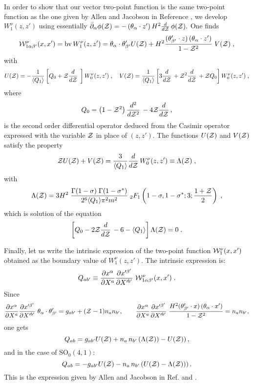\documentclass[a4paper,11pt,showpacs,preprintnumbers]{revtex4}
\def\z {{\cal Z}}
\def\dz {\frac{d}{d{\cal Z}}\,}
\def\ddz {\frac{d^2}{d{\cal Z}^2}\,}
\def\ab{\frac{\partial x^{\alpha}}{\partial X^a}\frac{\partial x'^{\beta'}}{\partial X'^{b'}}\;}
\begin{document}
\begin{appendix}
In order to show that our vector two-point function  is the same
two-point function as the one given by Allen and Jacobson in
Reference \cite{allen}, we develop $W^{\nu}_{1}(z,z')$ using
essentially
$\bar\partial_{\alpha}\phi(\z)=-\left(\theta_{\alpha}\cdot
z'\right)H^{2}\dz \phi(\z).$ One finds
$$ {\cal W}^{\nu}_{1\alpha\beta'}(x,x')=\mbox{bv}\,W^{\nu}_{1}(z,z')=\theta_{\alpha}\cdot\theta'_{\beta'}U(\z)
+H^2{{(\theta'_{\beta'}\cdot z)\left(\theta_{\alpha}\cdot
z'\right)}\over{1-\z^2}}\;V(\z)\;,$$ with
\begin{equation}
U(\z)=-{{1}\over{\langle Q_1\rangle}} \left[Q_{0}+\z\dz\;\right]{
W^{\nu}_{0}(z,z')} \;,\quad V(\z)={{1}\over{\langle
Q_1\rangle}}\left[3\dz+\z^2\dz+\z Q_{0}\right]
W^{\nu}_{0}(z,z')\;,\nonumber
\end{equation}
where
$$Q_{0}=\left(1-\z^2\right)\ddz-4\z\dz,$$
is the second order differential operator deduced from the Casimir
operator expressed with the variable $\z$ in place of $(z,z')$.
The functions $U(\z)$ and $V(\z)$ satisfy the property
$$\z U(\z)+V(\z)={{3}\over{\langle Q_1\rangle}}\dz {W^{\nu}_{0}(z,z')}\equiv\Lambda(\z)\;,$$
with
$$\Lambda(\z)=3H^2\;\frac{ \Gamma(1-\sigma)\; \Gamma (1-\sigma^{*})}{2^6\langle Q_1\rangle \pi^2m^2}\;
_{2}F_{1}\left(1-\sigma,1-\sigma^{*};3;\frac{1+\z}{2}\right) \;,$$
which is solution of the equation
$$\left[Q_{0}-2\z\dz-6-\langle Q_{1}\rangle\right]\Lambda(\z)=0\;.$$

Finally, let us write the intrinsic expression of the two-point
function ${\cal W}^{\nu}_{1}(x,x')$  obtained as the boundary
value of $W^{\nu}_{1}(z,z')$. The intrinsic expression is:
$$Q_{ab'}\equiv\ab {\cal
W}^{\nu}_{1\alpha\beta'}(x,x')\;.$$ Since
$$
\ab\theta_{\alpha}\cdot\theta'_{\beta'}=g_{ab'}+
(\z-1)n_{a}n_{b'},\qquad \ab {{H^2(\theta'_{\beta'}\cdot
x)\left(\theta_{\alpha}\cdot x'\right)}\over{1-\z^2}}=n_{a}n_{b'},
$$
one gets
$$
Q_{ab}=g_{ab'}U(\z)+n_{a}\,n_{b'}\left(\Lambda(\z))-U(\z)\right),
$$
and in the case of SO$_{0}(4,1)$:
$$Q_{ab}=-g_{ab'}U(\z)-n_{a}\,n_{b'}\left(U(\z)-\Lambda(\z))\right).$$
This is the expression given by Allen and Jacobson in Ref.
\cite{gasp} and \cite{allen}.


\end{appendix}
\end{document}
